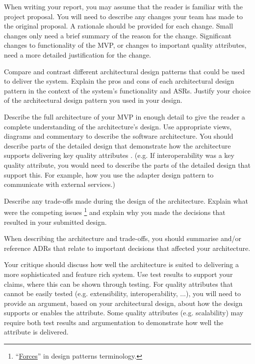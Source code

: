 \documentclass{csse4400}
\begin{document}
When writing your report, you may assume that the reader is familiar with the project proposal.
You will need to describe any changes your team has made to the original proposal.
A rationale should be provided for each change.
Small changes only need a brief summary of the reason for the change.
Significant changes to functionality of the MVP, or changes to important quality attributes,
need a more detailed justification for the change.

Compare and contrast different architectural design patterns that could be used to deliver the system.
Explain the pros and cons of each architectural design pattern in the context of the system's functionality and ASRs.
Justify your choice of the architectural design pattern you used in your design.

Describe the full architecture of your MVP in enough detail
to give the reader a complete understanding of the architecture's design.
Use appropriate views, diagrams and commentary to describe the software architecture.
You should describe parts of the detailed design that demonstrate how the architecture supports delivering key quality attributes \cite{view-notes}.
(e.g. If interoperability was a key quality attribute, you would need to describe the parts of the detailed design that support this.
For example, how you use the adapter design pattern to communicate with external services.)

Describe any trade-offs made during the design of the architecture.
Explain what were the competing issues%
\footnote{``\href{http://www.cs.unc.edu/~stotts/COMP723-s15/patterns/forces.html}{Forces}'' in design patterns terminology.}
and explain why you made the decisions that resulted in your submitted design.

When describing the architecture and trade-offs,
you should summarise and/or reference ADRs that relate to important decisions that affected your architecture.

Your critique should discuss how well the architecture is suited to delivering a more sophisticated and feature rich system.
Use test results to support your claims, where this can be shown through testing.
For quality attributes that cannot be easily tested (e.g. extensibility, interoperability, ...),
you will need to provide an argument, based on your architectural design, about how the design supports or enables the attribute.
Some quality attributes (e.g. scalability) may require both test results
and argumentation to demonstrate how well the attribute is delivered.
\end{document}
